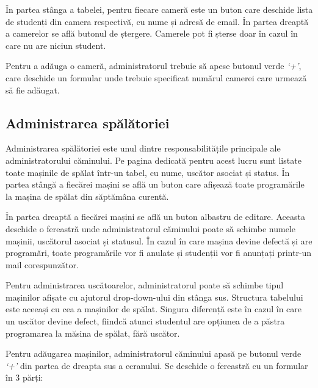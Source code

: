 \documentclass[12pt,a4paper]{report}
\theoremstyle{definition}
\theoremstyle{remark}
\begin{document}
\par În partea stânga a tabelei, pentru fiecare cameră este un buton care deschide lista de studenți din camera respectivă, cu nume și adresă de email. În partea dreaptă a camerelor se află butonul de ștergere. Camerele pot fi șterse doar în cazul în care nu are niciun student.


\par Pentru a adăuga o cameră, administratorul trebuie să apese butonul verde \textit{`+'}, care deschide un formular unde trebuie specificat numărul camerei care urmează să fie adăugat.


\subsection{Administrarea spălătoriei}

\par Administrarea spălătoriei este unul dintre responsabilitățile principale ale administratorului căminului. Pe pagina dedicată pentru acest lucru sunt listate toate mașinile de spălat într-un tabel, cu nume, uscător asociat și status. În partea stângă a fiecărei mașini se află un buton care afișează toate programările la mașina de spălat din săptămâna curentă. 


\par În partea dreaptă a fiecărei mașini se află un buton albastru de editare. Aceasta deschide o fereastră unde administratorul căminului poate să schimbe numele mașinii, uscătorul asociat și statusul. În cazul în care mașina devine defectă și are programări, toate programările vor fi anulate și studenții vor fi anunțați printr-un mail corespunzător.


\par Pentru administrarea uscătoarelor, administratorul poate să schimbe tipul \textnormal{ma\-și\-ni\-lor} afișate cu ajutorul drop-down-ului din stânga sus. Structura tabelului este aceeași cu cea a mașinilor de spălat. Singura diferență este în cazul în care un uscător devine defect, fiindcă atunci studentul are opțiunea de a păstra programarea la măsina de spălat, fără uscător.

\par Pentru adăugarea mașinilor, administratorul căminului apasă pe butonul verde \textit{`+'} din partea de dreapta sus a ecranului. Se deschide o fereastră cu un formular în 3 părți:
\end{document}
